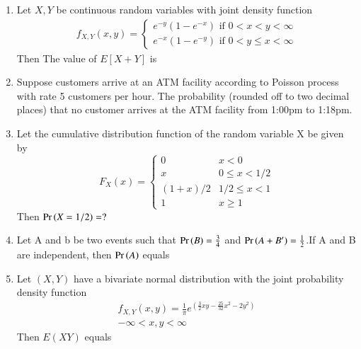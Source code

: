 \documentclass[journal,12pt,twocolumn]{IEEEtran}
\begin{document}
\begin{enumerate}
\begin{enumerate}
\end{enumerate}
  \solution
  
%
\item Let $X ,Y$ be continuous random variables with joint density function
\begin{align*}
    f_{X,Y}(x,y)=\begin{cases}
    e^{-y}(1-e^{-x}) \text{   if } 0< x<y<\infty\\
    e^{-x}(1-e^{-y}) \text{   if } 0< y\leq x<\infty
    \end{cases}
\end{align*}
Then The value of $E[X+Y]$ is 
%
\solution
  
%
\item Suppose customers arrive at an ATM facility according to Poisson process with rate 5 customers per hour. The probability (rounded off to two decimal places) that no customer arrives at the ATM facility from 1:00pm to 1:18pm.
%
\solution
  
%
\item     Let the cumulative distribution function of the random variable X be given by 
    $$F_{X}(x)=\left\{
    \begin{array}{ll}
      0 & x<0 \\
      x & 0\leq x<1/2\\
      (1+x)/2 & 1/2\leq x <1\\
      1 & x\geq 1
    \end{array} 
    \right. $$
    Then $\Pr\left(X=1/2\right)=?$
%
\solution
  
%
\item Let A and b be two events such that $\Pr\left(B\right)=\frac{3}{4}$ and $\Pr\left(A + B^{\prime}\right)=\frac{1}{2}$.If A and B are independent, then $\Pr\left(A\right)$ equals
\\
\solution
  
\item Let $(X,Y)$ have a bivariate normal distribution with the joint probability density function
\begin{align}
f_{X,Y}(x,y)=\frac{1}{\pi}e^{(\frac{3}{2}xy-\frac{25}{32}x^2-2y^2)}\\
-\infty < x,y < \infty
\end{align}
Then $E(XY)$ equals 
%
\\

\end{enumerate}
\end{document}

